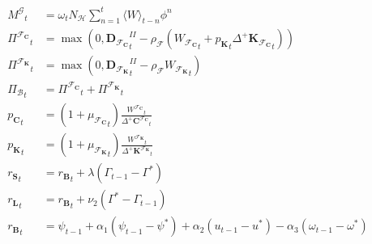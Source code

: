 \documentclass[a4paper, headings=standardclasses]{scrartcl}
\numberwithin{equation}{subsection}
\begin{document}
{\begin{align}
		{M^\mathcal{G}}_t                                 & = \omega_t N_{\mathcal{H}} \sum_{n=1}^{t}{\langle W \rangle}_{t-n} \phi^n \\
		{\Pi^{\mathcal{F}_\mathbf{C}}}_t                  & = \max(0, {\mathbf{D}_{\mathcal{F}_\mathbf{C}}}^{II}_t - \rho_\mathcal{F}({W_{\mathcal{F}_\mathbf{C}}}_t + {p_{\mathbf{K}}}_t {\Delta^+{\mathbf{K}_{\mathcal{F}_\mathbf{C}}}}_t )) \\
		{\Pi^{\mathcal{F}_\mathbf{K}}}_t                  & = \max(0, {\mathbf{D}_{\mathcal{F}_\mathbf{K}}}^{II}_t - \rho_\mathcal{F}{W_{\mathcal{F}_\mathbf{K}}}_t) \\
		{\Pi_\mathcal{B}}_t                               & = {\Pi^{\mathcal{F}_\mathbf{C}}}_t + {\Pi^{\mathcal{F}_\mathbf{K}}}_t                                                                                                                                                                                                         \\
		{p_\mathbf{C}}_t                                  & = (1+{\mu_{\mathcal{F}_\mathbf{C}}}_t) \frac{{W^{\mathcal{F}_\mathbf{C}}}_t}{{\Delta^+\mathbf{C}^{\mathcal{F}_\mathbf{C}}}_t}                                                                                                                                                 \\
		{p_\mathbf{K}}_t                                  & = (1+{\mu_{\mathcal{F}_\mathbf{K}}}_t) \frac{{W^{\mathcal{F}_\mathbf{K}}}_t}{{\Delta^+\mathbf{K}^{\mathcal{F}_\mathbf{K}}}_t}                                                                                                                                                 \\
		{r_\mathbf{S}}_t                                  & = {r_\mathbf{B}}_t + \lambda(\Gamma_{t-1} - \Gamma^*)                                                                                                                                                                                                                         \\
		{r_\mathbf{L}}_t                                  & = {r_\mathbf{B}}_t + \nu_2 (\Gamma^* - \Gamma_{t-1})                                                                                                                                                                                                                          \\
		{r_\mathbf{B}}_t                                  & = \psi_{t-1} + \alpha_1 (\psi_{t-1} - \psi^*) + \alpha_2 (u_{t-1} - u^*) - \alpha_3 (\omega_{t-1} - \omega^*)                                                                                                                                                                 \\

\end{align}}
\end{document}
